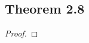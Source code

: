 \documentclass[../../main.tex]{subfiles}
\begin{document}
\subsection{Theorem 2.8}
\begin{wts}

\end{wts}
\begin{proof}

\end{proof}
\end{document}
